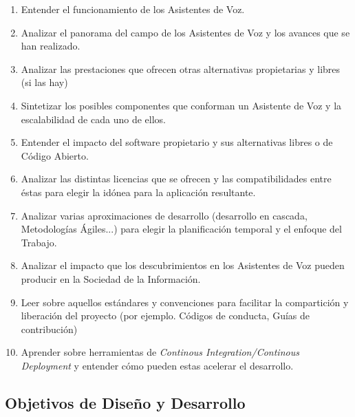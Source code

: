 \begin{enumerate}[O-{IA}.1 -]
	\item Entender el funcionamiento de los Asistentes de Voz.
	\item Analizar el panorama del campo de los Asistentes de Voz y los avances que se han realizado.
	\item Analizar las prestaciones que ofrecen otras alternativas propietarias y libres (si las hay)
	\item Sintetizar los posibles componentes que conforman un Asistente de Voz y la escalabilidad de cada uno de ellos.
	\item Entender el impacto del software propietario y sus alternativas libres o de Código Abierto.
	\item Analizar las distintas licencias que se ofrecen y las compatibilidades entre éstas para elegir la idónea para la aplicación resultante.
	\item Analizar varias aproximaciones de desarrollo (desarrollo en cascada, Metodologías Ágiles...) para elegir la planificación temporal y el enfoque del Trabajo.
	\item Analizar el impacto que los descubrimientos en los Asistentes de Voz pueden producir en la Sociedad de la Información.
	\item Leer sobre aquellos estándares y convenciones para facilitar la compartición y liberación del proyecto (por ejemplo. Códigos de conducta, Guías de contribución)
	\item Aprender sobre herramientas de \textit{Continous Integration/Continous Deployment} y entender cómo pueden estas acelerar el desarrollo.
\end{enumerate}

\subsection{Objetivos de Diseño y Desarrollo}

